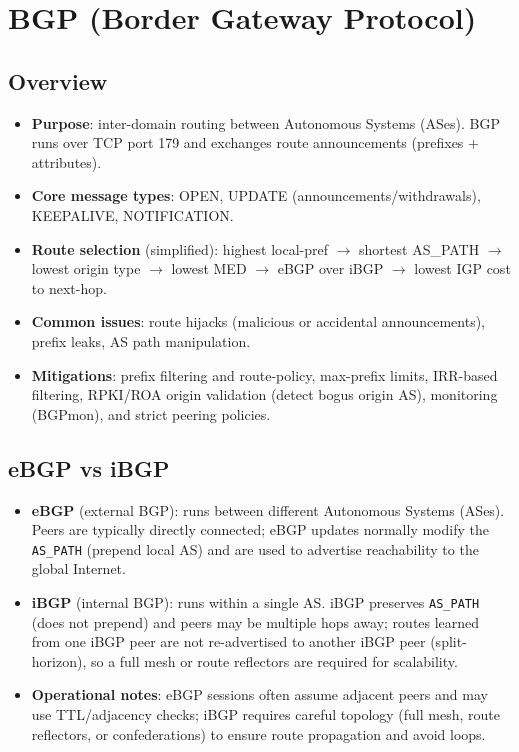 \documentclass[11pt]{article}
\begin{document}
\section{BGP (Border Gateway Protocol)}

\subsection{Overview}
\begin{itemize}
  \item \textbf{Purpose}: inter-domain routing between Autonomous Systems (ASes). BGP runs over TCP port 179 and exchanges route announcements (prefixes + attributes).
  
  \item \textbf{Core message types}: OPEN, UPDATE (announcements/withdrawals), KEEPALIVE, NOTIFICATION.
  
  \item \textbf{Route selection} (simplified): highest local-pref $\rightarrow$ shortest AS\_PATH $\rightarrow$ lowest origin type $\rightarrow$ lowest MED $\rightarrow$ eBGP over iBGP $\rightarrow$ lowest IGP cost to next-hop.
  
  \item \textbf{Common issues}: route hijacks (malicious or accidental announcements), prefix leaks, AS path manipulation.
  
  \item \textbf{Mitigations}: prefix filtering and route-policy, max-prefix limits, IRR-based filtering, RPKI/ROA origin validation (detect bogus origin AS), monitoring (BGPmon), and strict peering policies.
\end{itemize}

\subsection{eBGP vs iBGP}
\begin{itemize}
  \item \textbf{eBGP} (external BGP): runs between different Autonomous Systems (ASes). Peers are typically directly connected; eBGP updates normally modify the \texttt{AS\_PATH} (prepend local AS) and are used to advertise reachability to the global Internet.
  
  \item \textbf{iBGP} (internal BGP): runs within a single AS. iBGP preserves \texttt{AS\_PATH} (does not prepend) and peers may be multiple hops away; routes learned from one iBGP peer are not re-advertised to another iBGP peer (split-horizon), so a full mesh or route reflectors are required for scalability.
  
  \item \textbf{Operational notes}: eBGP sessions often assume adjacent peers and may use TTL/adjacency checks; iBGP requires careful topology (full mesh, route reflectors, or confederations) to ensure route propagation and avoid loops.
\end{itemize}
\end{document}
